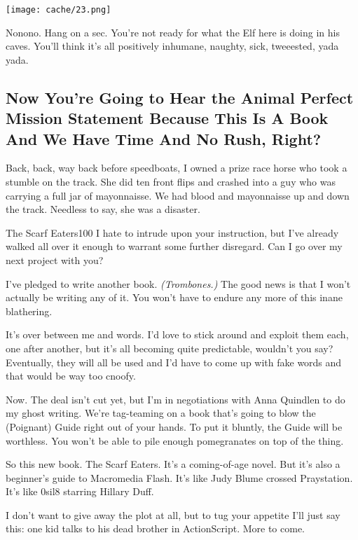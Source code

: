 \documentclass[12pt,twoside]{report}
\begin{document}
\begin{center}

	\texttt{[image: cache/23.png]} 

\end{center}

Nonono. Hang on a sec.  You're not ready for what the Elf here is
doing in his caves. You'll think it's all positively inhumane,
naughty, sick, tweeested, yada yada.



\subsection{ Now You're Going to Hear the Animal Perfect Mission
  Statement Because This Is A Book And We Have Time And No Rush,
  Right?}

Back, back, way back before speedboats, I owned a prize race horse who
took a stumble on the track.  She did ten front flips and crashed into
a guy who was carrying a full jar of mayonnaisse.  We had blood and
mayonnaisse up and down the track.  Needless to say, she was a
disaster.


\pagebreak

	\begin{sidebar}{The Scarf Eaters}{100}
		I hate to intrude upon your instruction, but I've already walked all over it enough to warrant some further disregard. Can I go over my next project with you?\vspace{6px}
		
		I've pledged to write another book. \textit{(Trombones.)} The good news is that I won't actually be writing any of it. You won't have to endure any more of this inane blathering.\vspace{6px}
		
		It's over between me and words. I'd love to stick around and exploit them each, one after another, but it's all becoming quite predictable, wouldn't you say? Eventually, they will all be used and I'd have to come up with fake words and that would be way too cnoofy.\vspace{6px}

		Now. The deal isn't cut yet, but I'm in negotiations with Anna Quindlen to do my ghost writing. We're tag-teaming on a book that's going to blow the (Poignant) Guide right out of your hands. To put it bluntly, the Guide will be worthless. You won't be able to pile enough pomegranates on top of the thing.\vspace{6px}
	
		So this new book. The Scarf Eaters. It's a coming-of-age novel. But it's also a beginner's guide to Macromedia Flash. It's like Judy Blume crossed Praystation. It's like 0sil8 starring Hillary Duff.\vspace{6px}
		
		I don't want to give away the plot at all, but to tug your appetite I'll just say this: one kid talks to his dead brother in ActionScript. More to come.\vspace{6px}
	\end{sidebar}
\end{document}
